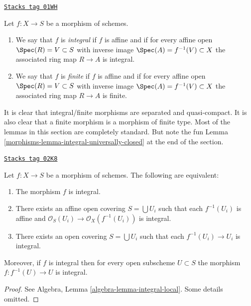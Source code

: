 \begin{definition}[Integral]
\label{morphisms-definition-integral}
\href{https://stacks.math.columbia.edu/tag/01WH}{\texttt{Stacks tag 01WH}}

Let $f : X \to S$ be a morphism of schemes.
\begin{enumerate}
\item We say that $f$ is {\it integral} if $f$ is affine
and if for every affine open $\Spec(R) = V \subset S$
with inverse image $\Spec(A) = f^{-1}(V) \subset X$
the associated ring map $R \to A$ is integral.
\item We say that $f$ is {\it finite} if $f$ is affine
and if for every affine open $\Spec(R) = V \subset S$
with inverse image $\Spec(A) = f^{-1}(V) \subset X$
the associated ring map $R \to A$ is finite.
\end{enumerate}
\end{definition}

It is clear that integral/finite morphisms are separated and
quasi-compact. It is also clear that a finite morphism is a
morphism of finite type. Most of the lemmas in this section are
completely standard.
But note the fun Lemma \ref{morphisms-lemma-integral-universally-closed}
at the end of the section.

\begin{lemma}
\label{morphisms-lemma-integral-local}
\href{https://stacks.math.columbia.edu/tag/02K8}{\texttt{Stacks tag 02K8}}

Let $f : X \to S$ be a morphism of schemes.
The following are equivalent:
\begin{enumerate}
\item The morphism $f$ is integral.
\item There exists an affine open covering $S = \bigcup U_i$ such that
each $f^{-1}(U_i)$ is affine and
$\mathcal{O}_S(U_i) \to \mathcal{O}_X(f^{-1}(U_i))$ is integral.
\item There exists an open covering $S = \bigcup U_i$
such that each $f^{-1}(U_i) \to U_i$ is integral.
\end{enumerate}
Moreover, if $f$ is integral then for every open subscheme
$U \subset S$ the morphism $f : f^{-1}(U) \to U$ is integral.
\end{lemma}

\begin{proof}
See Algebra, Lemma \ref{algebra-lemma-integral-local}.
Some details omitted.
\end{proof}

